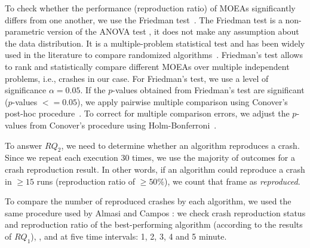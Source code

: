 To check whether the performance (reproduction ratio) of MO\-EAs significantly differs from one another, we use the Friedman test~\cite{garcia2008study}. The Friedman test is a non-parametric version of the ANOVA test \cite{fisher1936use}, \ie it does not make any assumption about the data distribution. It is a multiple-problem statistical test and has been widely used in the literature to compare randomized algorithms~\cite{Panichella2017c, Jan2017}.
Friedman's test allows to rank and statistically compare different MOEAs over multiple independent problems, i.e., crashes in our case. %
For Friedman's test, we use a level of significance $\alpha = 0.05$. If the $p$-values obtained from Friedman's test are significant (\textrm{$p$-values} $<= 0.05$), we apply pairwise multiple comparison using Conover's post-hoc procedure~\cite{conover1981rank}. To correct for multiple comparison errors, we adjust the $p$-values from Conover's procedure using Holm-Bonferroni~\cite{holm79}.

To answer $RQ_2$, we need to determine whether an algorithm reproduces a crash.
Since we repeat each execution 30 times, we use the majority of outcomes for a crash reproduction result. In other words, if an algorithm could reproduce a crash in $\geq 15$ runs (\ie reproduction ratio of $\geq50\%$), we count that frame as \textit{reproduced}.

To compare the number of reproduced crashes by each algorithm, we used the same procedure used by Almasi \etal \cite{almasi2017industrial} and Campos \etal \cite{campos2013entropy}: we check crash reproduction status and reproduction ratio of the best-performing \moho algorithm (according to the results of $RQ_1$), \SGGA, and \decomposition at five time intervals: 1, 2, 3, 4 and 5 minute.


